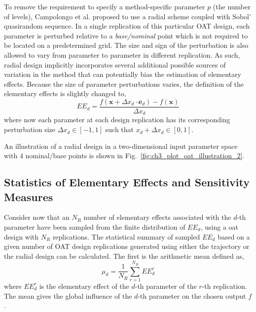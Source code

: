 To remove the requirement to specify a method-specific parameter $p$ (the number of levels),
Campolongo et al.\cite{Campolongo2011} proposed to use a radial scheme coupled with Sobol' quasirandom sequence.
In a single replication of this particular OAT design, 
each parameter is perturbed relative to a \textit{base/nominal} point 
which is not required to be located on a predetermined grid.
The size and sign of the perturbation is also allowed to vary from parameter to parameter in different replication.
As such, radial design implicitly incorporates several additional possible sources of variation in the method 
that can potentially bias the estimation of elementary effects.
Because the size of parameter perturbations varies, the definition of the elementary effects is slightly changed to,
\begin{equation}
EE_d = \frac{f(\bm{x} + \Delta x_d \cdot \bm{e}_d) - f(\bm{x})}{\Delta x_d}
\end{equation}
where now each parameter at each design replication has its corresponding perturbation size $\Delta x_d \in [-1,1]$ such that $x_d + \Delta x_d \in [0,1]$.

An illustration of a radial design in a two-dimensional input parameter space with $4$ nominal/base points is shown in Fig.~\ref{fig:ch3_plot_oat_illustration_2}.
 
\subsection{Statistics of Elementary Effects and Sensitivity Measures}\label{sub:sa_ee_statistics}

Consider now that an $N_R$ number of elementary effects associated with the $d$-th parameter have been sampled from the finite distribution of $EE_d$,
using a \gls{oat} design with $N_R$ replications.
The statistical summary of sampled $EE_d$ based on a given number of OAT design replications generated using either the trajectory or the radial design can be calculated.
The first is the arithmetic mean defined as,
\begin{equation}
	\mu_d = \frac{1}{N_R} \sum_{r = 1}^{N_R} EE^r_d
	\label{eq:sa_morris_mu}
\end{equation} 
where $EE^r_d$ is the elementary effect of the $d$-th parameter of the $r$-th replication.
The mean gives the global influence of the $d$-th parameter on the chosen output $f$.


